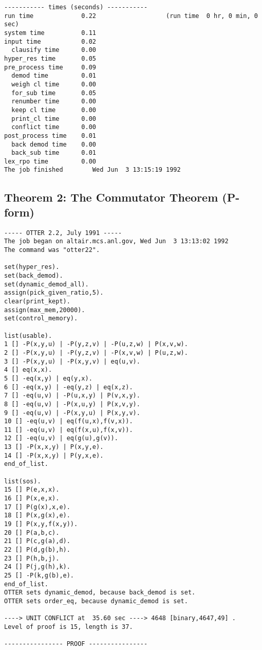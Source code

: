{\begin{verbatim}
----------- times (seconds) -----------
run time             0.22                   (run time  0 hr, 0 min, 0 sec)
system time          0.11
input time           0.02
  clausify time      0.00
hyper_res time       0.05
pre_process time     0.09
  demod time         0.01
  weigh cl time      0.00
  for_sub time       0.05
  renumber time      0.00
  keep cl time       0.00
  print_cl time      0.00
  conflict time      0.00
post_process time    0.01
  back demod time    0.00
  back_sub time      0.01
lex_rpo time         0.00
The job finished        Wed Jun  3 13:15:19 1992
\end{verbatim} }
\subsection{Theorem 2: The Commutator Theorem (P-form)}
{\small \begin{verbatim}
----- OTTER 2.2, July 1991 -----
The job began on altair.mcs.anl.gov, Wed Jun  3 13:13:02 1992
The command was "otter22".

set(hyper_res).
set(back_demod).
set(dynamic_demod_all).
assign(pick_given_ratio,5).
clear(print_kept).
assign(max_mem,20000).
set(control_memory).

list(usable).
1 [] -P(x,y,u) | -P(y,z,v) | -P(u,z,w) | P(x,v,w).
2 [] -P(x,y,u) | -P(y,z,v) | -P(x,v,w) | P(u,z,w).
3 [] -P(x,y,u) | -P(x,y,v) | eq(u,v).
4 [] eq(x,x).
5 [] -eq(x,y) | eq(y,x).
6 [] -eq(x,y) | -eq(y,z) | eq(x,z).
7 [] -eq(u,v) | -P(u,x,y) | P(v,x,y).
8 [] -eq(u,v) | -P(x,u,y) | P(x,v,y).
9 [] -eq(u,v) | -P(x,y,u) | P(x,y,v).
10 [] -eq(u,v) | eq(f(u,x),f(v,x)).
11 [] -eq(u,v) | eq(f(x,u),f(x,v)).
12 [] -eq(u,v) | eq(g(u),g(v)).
13 [] -P(x,x,y) | P(x,y,e).
14 [] -P(x,x,y) | P(y,x,e).
end_of_list.

list(sos).
15 [] P(e,x,x).
16 [] P(x,e,x).
17 [] P(g(x),x,e).
18 [] P(x,g(x),e).
19 [] P(x,y,f(x,y)).
20 [] P(a,b,c).
21 [] P(c,g(a),d).
22 [] P(d,g(b),h).
23 [] P(h,b,j).
24 [] P(j,g(h),k).
25 [] -P(k,g(b),e).
end_of_list.
OTTER sets dynamic_demod, because back_demod is set.
OTTER sets order_eq, because dynamic_demod is set.

----> UNIT CONFLICT at  35.60 sec ----> 4648 [binary,4647,49] .
Level of proof is 15, length is 37.

---------------- PROOF ----------------


\end{verbatim}}
